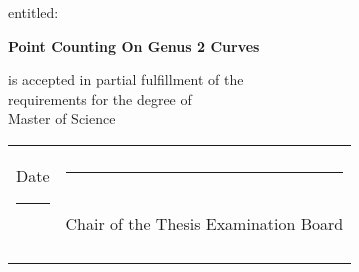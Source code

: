\begin{center}
\vspace*{0.2cm}

entitled: \\

\vspace*{0.2cm}

\textbf{Point Counting On Genus 2 Curves} \\

\vspace*{0.2cm}

is accepted in partial fulfillment of the \\
requirements for the degree of \\
Master of Science \\

\vspace*{2cm}

\begin{table}[h]
\centering
\begin{tabular}{p{8cm}p{8cm}}
\parbox{7cm}{Date \rule{5cm}{0.2mm} \\ \smallskip} & \parbox{7cm}{\rule{7cm}{0.2mm} \\ \smallskip 
Chair of the Thesis Examination Board} 
\end{tabular}
\end{table}


\end{center}


